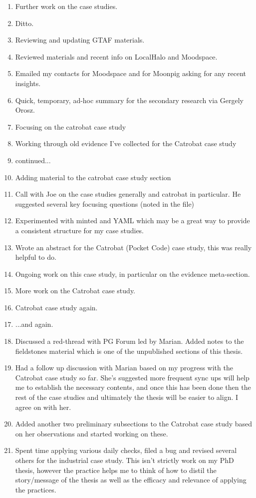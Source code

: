 \begin{enumerate}
    \item Further work on the case studies.
    \item Ditto.
    \item Reviewing and updating GTAF materials.
    \item Reviewed materials and recent info on LocalHalo and Moodspace.
    \item Emailed my contacts for Moodspace and for Moonpig asking for any recent insights.
    \item Quick, temporary, ad-hoc summary for the secondary research via Gergely Orosz.
    \item Focusing on the catrobat case study
    \item Working through old evidence I've collected for the Catrobat case study
    \item continued...
    \item Adding material to the catrobat case study section
    \item Call with Joe on the case studies generally and catrobat in particular. He suggested several key focusing questions (noted in the file)
    \item Experimented with minted and YAML which may be a great way to provide a consistent structure for my case studies.
    \item Wrote an abstract for the Catrobat (Pocket Code) case study, this was really helpful to do.
    \item Ongoing work on this case study, in particular on the evidence meta-section.
    \item More work on the Catrobat case study.
    \item Catrobat case study again.
    \item ...and again.
    \item Discussed a red-thread with PG Forum led by Marian. Added notes to the fieldstones material which is one of the unpublished sections of this thesis.
    \item Had a follow up discussion with Marian based on my progress with the Catrobat case study so far. She's suggested more frequent sync ups will help me to establish the necessary contents, and once this has been done then the rest of the case studies and ultimately the thesis will be easier to align. I agree on with her.
    \item Added another two preliminary subsections to the Catrobat case study based on her observations and started working on these.
    \item Spent time applying various daily checks, filed a bug and revised several others for the industrial case study. This isn't strictly work on my PhD thesis, however the practice helps me to think of how to distil the story/message of the thesis as well as the efficacy and relevance of applying the practices.

\end{enumerate}
